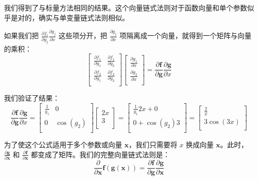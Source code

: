 \documentclass[11pt]{article}
\begin{document}
我们得到了与标量方法相同的结果。这个向量链式法则对于函数向量和单个参数似乎是对的，确实与单变量链式法则相似。

如果我们把 \(\frac{\partial f_i}{\partial g_j}\frac{\partial g_j}{\partial x}\) 这些项分开，把 \(\frac{\partial g_j}{\partial x}\) 项隔离成一个向量，就得到一个矩阵与向量的乘积：
\[
\begin{bmatrix}
\frac{\partial f_1}{\partial g_1} & \frac{\partial f_1}{\partial g_2}\\
\frac{\partial f_2}{\partial g_1} & \frac{\partial f_2}{\partial g_2}\\
\end{bmatrix}
\begin{bmatrix}
\frac{\partial g_1}{\partial x}\\
\frac{\partial g_2}{\partial x}\\
\end{bmatrix} = \frac{\partial \mathbf{f}}{\partial \mathbf{g}}\frac{\partial \mathbf{g}}{\partial x}
\]

我们验证了结果：
\[
\frac{\partial \mathbf{f}}{\partial \mathbf{g}}\frac{\partial \mathbf{g}}{\partial x} = \begin{bmatrix}
\frac{1}{g_1} & 0\\
0 & \cos(g_2)\\
\end{bmatrix}
\begin{bmatrix}
2x\\
3\\
\end{bmatrix} = \begin{bmatrix}
\frac{1}{g_1}2x + 0\\
0 + \cos(g_2)3\\
\end{bmatrix} = \begin{bmatrix}
\frac{2}{x}\\
3\cos(3x)\\
\end{bmatrix}
\]

为了使这个公式适用于多个参数或向量 \(\mathbf{x}\)，我们只需要将 \(x\) 换成向量 \(\mathbf{x}\)。此时，\(\frac{\partial \mathbf{g}}{\partial \mathbf{x}}\) 和 \(\frac{\partial \mathbf{f}}{\partial \mathbf{x}}\) 都变成了矩阵。我们的完整向量链式法则是：
\[
\frac{\partial}{\partial \mathbf{x}} \mathbf{f}(\mathbf{g}(\mathbf{x})) = \frac{\partial \mathbf{f}}{\partial \mathbf{g}}\frac{\partial \mathbf{g}}{\partial \mathbf{x}}
\]
\end{document}
